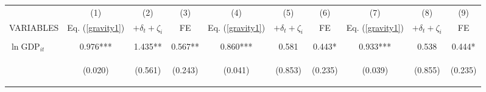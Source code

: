 \begin{center}
\begin{tabular}{lccccccccc} \hline
 & (1) & (2) & (3) & (4) & (5) & (6) & (7) & (8) & (9) \\
VARIABLES & Eq. (\ref{gravity1}) & $+\delta_t+\zeta_i$ & FE & Eq. (\ref{gravity1}) & $+\delta_t+\zeta_i$ & FE & Eq. (\ref{gravity1}) & $+\delta_t+\zeta_i$ & FE \\ \hline
\vspace{4pt} & \begin{footnotesize}\end{footnotesize} & \begin{footnotesize}\end{footnotesize} & \begin{footnotesize}\end{footnotesize} & \begin{footnotesize}\end{footnotesize} & \begin{footnotesize}\end{footnotesize} & \begin{footnotesize}\end{footnotesize} & \begin{footnotesize}\end{footnotesize} & \begin{footnotesize}\end{footnotesize} & \begin{footnotesize}\end{footnotesize} \\
$\ln\text{GDP}_{it}$ & 0.976*** & 1.435** & 0.567** & 0.860*** & 0.581 & 0.443* & 0.933*** & 0.538 & 0.444* \\
\vspace{4pt} & \begin{footnotesize}(0.020)\end{footnotesize} & \begin{footnotesize}(0.561)\end{footnotesize} & \begin{footnotesize}(0.243)\end{footnotesize} & \begin{footnotesize}(0.041)\end{footnotesize} & \begin{footnotesize}(0.853)\end{footnotesize} & \begin{footnotesize}(0.235)\end{footnotesize} & \begin{footnotesize}(0.039)\end{footnotesize} & \begin{footnotesize}(0.855)\end{footnotesize} & \begin{footnotesize}(0.235)\end{footnotesize} \\

\end{tabular}
\end{center}
